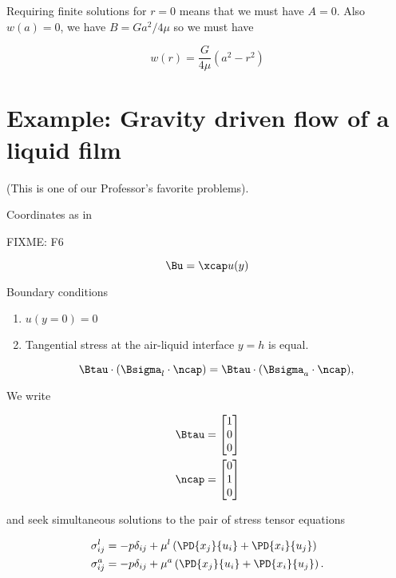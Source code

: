 Requiring finite solutions for $r = 0$ means that we must have $A = 0$.  Also $w(a) = 0$, we have $B = G a^2/4 \mu$ so we must have

\begin{equation}\label{eqn:continuumL12:130}
w(r) = \frac{G}{4 \mu}( a^2 - r^2 )
\end{equation}

\section{Example: Gravity driven flow of a liquid film}

(This is one of our Professor's favorite problems).

Coordinates as in

FIXME: F6

\begin{equation}\label{eqn:continuumL12:150}
\Bu = \xcap u(y)
\end{equation}

Boundary conditions

\begin{enumerate}
\item $u(y = 0) = 0$
\item Tangential stress at the air-liquid interface $y = h$ is equal.

\begin{equation}\label{eqn:continuumL12:170}
\Btau \cdot (\Bsigma_l \cdot \ncap) = \Btau \cdot (\Bsigma_a \cdot \ncap),
\end{equation}
\end{enumerate}

We write 

\begin{align}\label{eqn:continuumL12:190}
\Btau &= 
\begin{bmatrix}
1 \\
0 \\
0
\end{bmatrix} \\
\ncap &= 
\begin{bmatrix}
0 \\
1 \\
0
\end{bmatrix} \\
\end{align}

and seek simultaneous solutions to the pair of stress tensor equations

\begin{align}\label{eqn:continuumL12:210}
\sigma_{ij}^l 
&= - p \delta_{ij} + \mu^l \left( 
\PD{x_j}{u_i} +
\PD{x_i}{u_j}
\right) \\
\sigma_{ij}^a 
&= - p \delta_{ij} + \mu^a \left( 
\PD{x_j}{u_i} +
\PD{x_i}{u_j}
\right).
\end{align}

